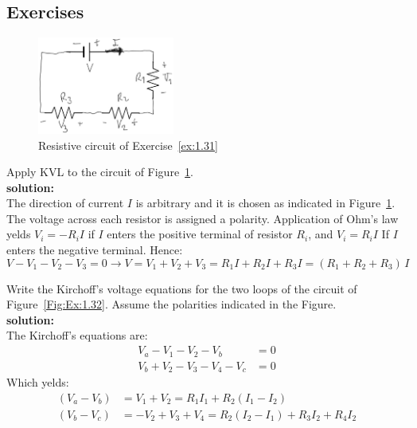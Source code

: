 \subsection*{Exercises}
\begin{figure}[h!]
  \centering
  \includegraphics[width=0.4\textwidth]{"images/Fig-10"}
  \caption{Resistive circuit of Exercise~\ref{ex:1.31}} 
  \label{Fig:Ex:1.31}
\end{figure}

\begin{exercise}
\label{ex:1.31}
Apply KVL to the circuit of Figure~\ref{Fig:Ex:1.31}.\\

\textbf{solution:}\\
The direction of current $I$ is arbitrary and it is chosen as indicated in Figure~\ref{Fig:Ex:1.31}. The voltage across each resistor is assigned a polarity. Application of Ohm's law yelds $V_i = -R_iI$ if $I$ enters the positive terminal of resistor $R_i$, and $V_i=R_iI$ If $I$ enters the negative terminal. Hence:
\[V -V_1 - V_2 - V_3 = 0 \longrightarrow V = V_1 + V_2 + V_3 = R_1I + R_2I + R_3I = (R_1 + R_2 +R_3)\,I\]
\end{exercise}

\begin{exercise}
\label{ex:1.32}
Write the Kirchoff's voltage equations for the two loops of the circuit of Figure~\ref{Fig:Ex:1.32}. Assume the polarities indicated in the Figure.\\

\textbf{solution:}\\
The Kirchoff's equations are:
\begin{equation*}
\begin{split}
V_a - V_1 - V_2 - V_b &= 0\\
V_b + V_2 - V_3 - V_4 - V_c &= 0
\end{split}
\end{equation*}
Which yelds:
\begin{equation*}
\begin{split}
(V_a - V_b) &= V_1 + V_2 = R_1I_1 + R_2(I_1 - I_2)\\
(V_b - V_c) &= -V_2 + V_3 + V_4 = R_2(I_2 - I_1) + R_3I_2 + R_4I_2
\end{split}
\end{equation*}
\end{exercise}

